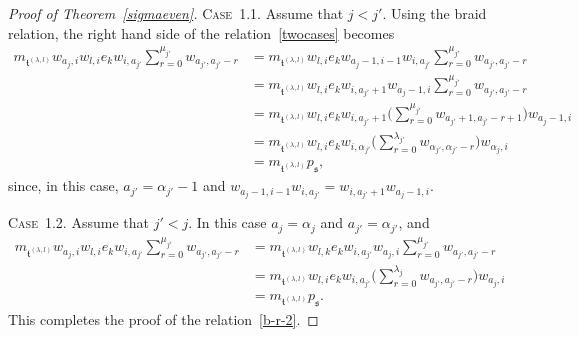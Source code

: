 \documentclass[11pt,a4paper,reqno,svgnames]{amsart}
\theoremstyle{plain}
\theoremstyle{definition}
\numberwithin{equation}{section}
\begin{document}
\begin{proof}[Proof of Theorem~\ref{sigmaeven}]
{\textsc{Case~1.1.}} Assume that $j<j'$. Using the braid relation, the right hand side of the relation~\eqref{twocases} becomes
\begin{align*}
m_{\mathfrak{t}^{(\lambda,l)}}  w_{a_j,i}w_{l,i}e_k w_{i,a_{j'}}\sum_{r=0}^{\mu_{j'}}w_{a_{j'},a_{j'}-r}&=
m_{\mathfrak{t}^{(\lambda,l)}} w_{l,i}e_k w_{a_j-1,i-1}w_{i,a_{j'}}\sum_{r=0}^{\mu_{j'}}w_{a_{j'},a_{j'}-r}\\
&=m_{\mathfrak{t}^{(\lambda,l)}} w_{l,i} e_kw_{i,a_{j'}+1}w_{a_j-1,i} \sum_{r=0}^{\mu_{j'}}w_{a_{j'},a_{j'}-r}\\
&=m_{\mathfrak{t}^{(\lambda,l)}}  w_{l ,i} e_k w_{i,a_{j'}+1} \bigg(\sum_{r=0}^{\mu_{j'}}w_{a_{j'}+1,a_{j'}-r+1}\bigg)w_{a_j-1,i}\\
&=m_{\mathfrak{t}^{(\lambda,l)}}  w_{ l ,i} e_k w_{i,\alpha_{j'}}\bigg(\sum_{r=0}^{\lambda_{j'}}w_{\alpha_{j'},\alpha_{j'}-r}\bigg)w_{\alpha_j,i}\\
&=m_{\mathfrak{t}^{(\lambda,l)}} p_{\mathfrak{s}},
\end{align*}
since, in this case, $a_{j'}=\alpha_{j'}-1$ and $w_{a_j-1,i-1}w_{i,a_{j'}}=w_{i,a_{j'}+1}w_{a_j-1,i}$. 

{\textsc{Case~1.2.}} Assume that $j'<j$. In this case $a_j=\alpha_j$ and $a_{j'}=\alpha_{j'}$, and 
\begin{align*}
m_{\mathfrak{t}^{(\lambda,l)}}   w_{a_j,i}w_{l,i}e_k w_{i,a_{j'}}\sum_{r=0}^{\mu_{j'}}w_{a_{j'},a_{j'}-r}
&=m_{\mathfrak{t}^{(\lambda,l)}} w_{l,k}e_k w_{i,a_{j'}}w_{a_j,i}\sum_{r=0}^{\mu_{j'}}w_{a_{j'},a_{j'}-r}\\
&=m_{\mathfrak{t}^{(\lambda,l)}}w_{l,i}e_k w_{i,a_{j'}}\bigg(\sum_{r=0}^{\lambda_j}w_{a_{j'},a_{j'}-r}\bigg)w_{a_j,i}\\
&=m_{\mathfrak{t}^{(\lambda,l)}}   p_\mathfrak{s}.
\end{align*}
This completes the proof of the relation~\eqref{b-r-2}. 


\end{proof}
\end{document}

